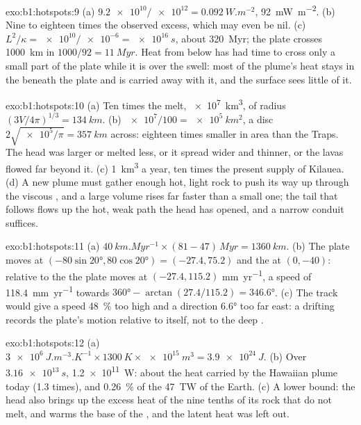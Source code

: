 \begin{solution}{exo:b1:hotspots:9}
(a) $\num{9.2e10}/\num{e12} = \qty{0.092}{W.m^{-2}}$, \qty{92}{mW.m^{-2}}.
(b) Nine to eighteen times the observed excess, which may even be nil.
(c) $L^2/\kappa =
\num{e10}/\num{e-6} = \qty{e16}{s}$, about \qty{320}{Myr}; the plate crosses
\qty{1000}{km} in $1000/92 = \qty{11}{Myr}$. Heat from below has had time to
cross only a small part of the plate while it is over the swell: most of the
plume's heat stays in the  beneath the plate and is carried away with
it, and the surface sees little of it.
\end{solution}

\begin{solution}{exo:b1:hotspots:10}
(a) Ten times the melt, \qty{e7}{km^3}, of radius
$(3V/4\pi)^{1/3} = \qty{134}{km}$. (b) $\num{e7}/100 = \qty{e5}{km^2}$, a disc
$2\sqrt{\num{e5}/\pi} = \qty{357}{km}$ across: eighteen times smaller in area
than the Traps. The head was larger or melted less, or it spread wider and
thinner, or the lavas flowed far beyond it. (c) \qty{1}{km^3} a year, ten
times the present supply of Kilauea. (d) A new plume must gather enough
hot, light rock to push its way up through the viscous , and a large
volume rises far faster than a small one; the tail that follows flows up the
hot, weak path the head has opened, and a narrow conduit suffices.
\end{solution}

\begin{solution}{exo:b1:hotspots:11}
(a) $\qty{40}{km.Myr^{-1}}\times(81 - 47)\,\unit{Myr} = \qty{1360}{km}$.
(b) The plate moves at $(-80\sin\ang{20}, 80\cos\ang{20}) = (-27.4, 75.2)$
and the  at $(0, -40)$: relative to the  the plate moves at
$(-27.4, 115.2)$ \unit{mm.yr^{-1}}, a speed of \qty{118.4}{mm.yr^{-1}} towards
$\ang{360} - \arctan(27.4/115.2) = \ang{346.6}$. (c) The track would give a
speed \qty{48}{\percent} too high and a direction \ang{6.6} too far east:
a drifting  records the plate's motion relative to itself, not to the
deep .
\end{solution}

\begin{solution}{exo:b1:hotspots:12}
(a) $\qty{3e6}{J.m^{-3}.K^{-1}}\times\qty{1300}{K}\times\qty{e15}{m^3} =
\qty{3.9e24}{J}$. (b) Over $\qty{3.16e13}{s}$, \qty{1.2e11}{W}: about the
heat carried by the Hawaiian plume today (1.3 times), and \qty{0.26}{\percent}
of the \qty{47}{TW} of the Earth. (c) A lower bound: the head also brings up
the excess heat of the nine tenths of its rock that do not melt, and warms the
base of the , and the latent heat was left out.
\end{solution}

